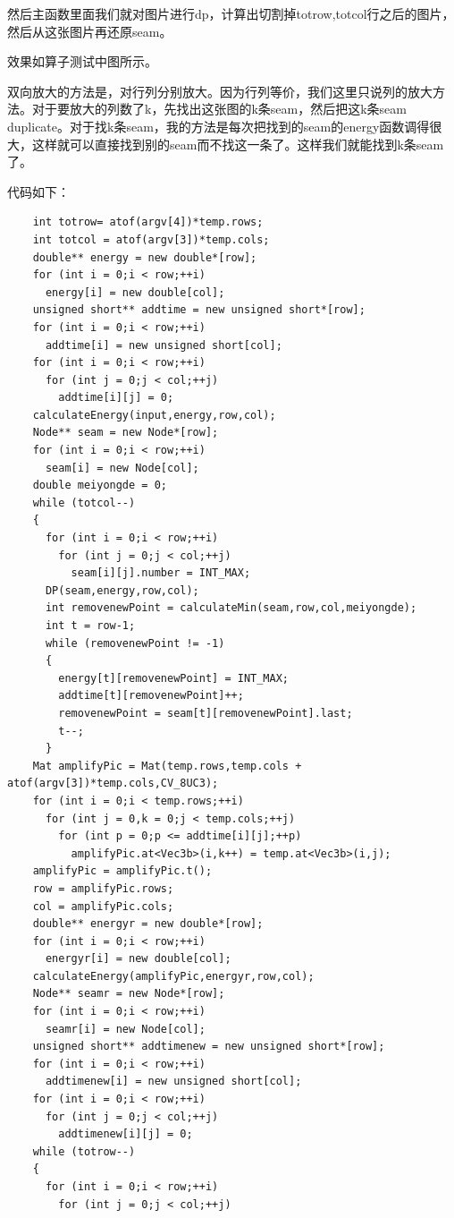 \documentclass[10pt, a4paper]{article}
\begin{document}
    然后主函数里面我们就对图片进行dp，计算出切割掉totrow,totcol行之后的图片，然后从这张图片再还原seam。

    效果如算子测试中图所示。

    双向放大的方法是，对行列分别放大。因为行列等价，我们这里只说列的放大方法。对于要放大的列数了k，先找出这张图的k条seam，然后把这k条seam duplicate。对于找k条seam，我的方法是每次把找到的seam的energy函数调得很大，这样就可以直接找到别的seam而不找这一条了。这样我们就能找到k条seam了。

    代码如下：
    \begin{lstlisting}
    int totrow= atof(argv[4])*temp.rows;
    int totcol = atof(argv[3])*temp.cols;
    double** energy = new double*[row];
    for (int i = 0;i < row;++i)
      energy[i] = new double[col];
    unsigned short** addtime = new unsigned short*[row];
    for (int i = 0;i < row;++i)
      addtime[i] = new unsigned short[col];
    for (int i = 0;i < row;++i)
      for (int j = 0;j < col;++j)
        addtime[i][j] = 0;
    calculateEnergy(input,energy,row,col);
    Node** seam = new Node*[row];
    for (int i = 0;i < row;++i)
      seam[i] = new Node[col];
    double meiyongde = 0;
    while (totcol--)
    {
      for (int i = 0;i < row;++i)
        for (int j = 0;j < col;++j)
          seam[i][j].number = INT_MAX;
      DP(seam,energy,row,col);
      int removenewPoint = calculateMin(seam,row,col,meiyongde);
      int t = row-1;
      while (removenewPoint != -1)
      {
        energy[t][removenewPoint] = INT_MAX;
        addtime[t][removenewPoint]++;
        removenewPoint = seam[t][removenewPoint].last;
        t--;
      }
    Mat amplifyPic = Mat(temp.rows,temp.cols + atof(argv[3])*temp.cols,CV_8UC3);
    for (int i = 0;i < temp.rows;++i)
      for (int j = 0,k = 0;j < temp.cols;++j)
        for (int p = 0;p <= addtime[i][j];++p)
          amplifyPic.at<Vec3b>(i,k++) = temp.at<Vec3b>(i,j);
    amplifyPic = amplifyPic.t();
    row = amplifyPic.rows;
    col = amplifyPic.cols;
    double** energyr = new double*[row];
    for (int i = 0;i < row;++i)
      energyr[i] = new double[col];
    calculateEnergy(amplifyPic,energyr,row,col);
    Node** seamr = new Node*[row];
    for (int i = 0;i < row;++i)
      seamr[i] = new Node[col];
    unsigned short** addtimenew = new unsigned short*[row];
    for (int i = 0;i < row;++i)
      addtimenew[i] = new unsigned short[col];
    for (int i = 0;i < row;++i)
      for (int j = 0;j < col;++j)
        addtimenew[i][j] = 0;
    while (totrow--)
    {
      for (int i = 0;i < row;++i)
        for (int j = 0;j < col;++j)

\end{lstlisting}
\end{document}
